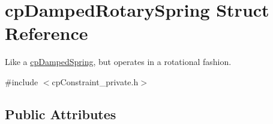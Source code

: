 \hypertarget{structcp_damped_rotary_spring}{}\section{cp\+Damped\+Rotary\+Spring Struct Reference}
\label{structcp_damped_rotary_spring}


Like a \hyperlink{structcp_damped_spring}{cp\+Damped\+Spring}, but operates in a rotational fashion.  




{\ttfamily \#include $<$cp\+Constraint\+\_\+private.\+h$>$}

\subsection*{Public Attributes}
